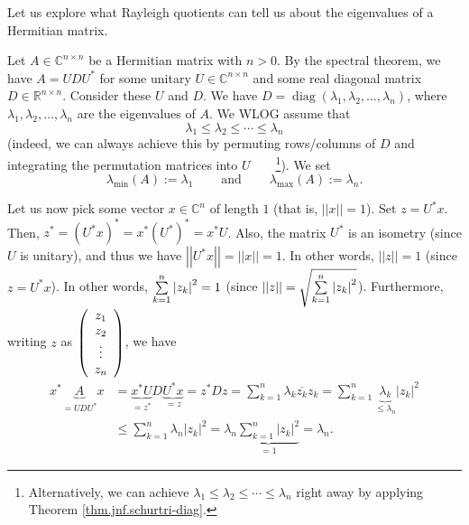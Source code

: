 \documentclass[numbers=enddot,12pt,final,onecolumn,notitlepage]{scrartcl}%
\numberwithin{exer}{subsection}
\theoremstyle{definition}
\let\sumnonlimits\sum
\renewcommand{\sum}{\sumnonlimits\limits}
\begin{document}
Let us explore what Rayleigh quotients can tell us about the eigenvalues of a
Hermitian matrix.

Let $A\in\mathbb{C}^{n\times n}$ be a Hermitian matrix with $n>0$. By the
spectral theorem, we have $A=UDU^{\ast}$ for some unitary $U\in\mathbb{C}%
^{n\times n}$ and some real diagonal matrix $D\in\mathbb{R}^{n\times n}$.
Consider these $U$ and $D$. We have $D=\operatorname*{diag}\left(  \lambda
_{1},\lambda_{2},\ldots,\lambda_{n}\right)  $, where $\lambda_{1},\lambda
_{2},\ldots,\lambda_{n}$ are the eigenvalues of $A$. We WLOG assume that
\[
\lambda_{1}\leq\lambda_{2}\leq\cdots\leq\lambda_{n}%
\]
(indeed, we can always achieve this by permuting rows/columns of $D$ and
integrating the permutation matrices into $U$\ \ \ \ \footnote{Alternatively,
we can achieve $\lambda_{1}\leq\lambda_{2}\leq\cdots\leq\lambda_{n}$ right
away by applying Theorem \ref{thm.jnf.schurtri-diag}.}). We set%
\[
\lambda_{\min}\left(  A\right)  :=\lambda_{1}\ \ \ \ \ \ \ \ \ \ \text{and}%
\ \ \ \ \ \ \ \ \ \ \lambda_{\max}\left(  A\right)  :=\lambda_{n}.
\]


Let us now pick some vector $x\in\mathbb{C}^{n}$ of length $1$ (that is,
$\left\vert \left\vert x\right\vert \right\vert =1$). Set $z=U^{\ast}x$. Then,
$z^{\ast}=\left(  U^{\ast}x\right)  ^{\ast}=x^{\ast}\left(  U^{\ast}\right)
^{\ast}=x^{\ast}U$. Also, the matrix $U^{\ast}$ is an isometry (since $U$ is
unitary), and thus we have $\left\vert \left\vert U^{\ast}x\right\vert
\right\vert =\left\vert \left\vert x\right\vert \right\vert =1$. In other
words, $\left\vert \left\vert z\right\vert \right\vert =1$ (since $z=U^{\ast
}x$). In other words, $\sum\limits_{k=1}^{n}\left\vert z_{k}\right\vert
^{2}=1$ (since $\left\vert \left\vert z\right\vert \right\vert =\sqrt
{\sum\limits_{k=1}^{n}\left\vert z_{k}\right\vert ^{2}}$). Furthermore,
writing $z$ as $\left(
\begin{array}
[c]{c}%
z_{1}\\
z_{2}\\
\vdots\\
z_{n}%
\end{array}
\right)  $, we have%
\begin{align*}
x^{\ast}\underbrace{A}_{=UDU^{\ast}}x  &  =\underbrace{x^{\ast}U}_{=z^{\ast}%
}D\underbrace{U^{\ast}x}_{=z}=z^{\ast}Dz=\sum_{k=1}^{n}\lambda_{k}%
\overline{z_{k}}z_{k}=\sum_{k=1}^{n}\underbrace{\lambda_{k}}_{\leq\lambda_{n}%
}\left\vert z_{k}\right\vert ^{2}\\
&  \leq\sum_{k=1}^{n}\lambda_{n}\left\vert z_{k}\right\vert ^{2}=\lambda
_{n}\underbrace{\sum_{k=1}^{n}\left\vert z_{k}\right\vert ^{2}}_{=1}%
=\lambda_{n}.
\end{align*}
\end{document}
